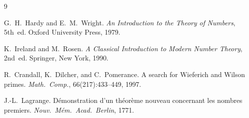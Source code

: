 \documentclass[12pt,a4paper]{amsart}
\theoremstyle{definition}
\begin{document}
\begin{thebibliography}{9}

G.~H.~Hardy and E.~M.~Wright.
\newblock \emph{An Introduction to the Theory of Numbers}, 5th~ed.
\newblock Oxford University Press, 1979.

K.~Ireland and M.~Rosen.
\newblock \emph{A Classical Introduction to Modern Number Theory}, 2nd~ed.
\newblock Springer, New York, 1990.

R.~Crandall, K.~Dilcher, and C.~Pomerance.
\newblock A search for Wieferich and Wilson primes.
\newblock \emph{Math.\ Comp.}, 66(217):433--449, 1997.

J.-L.~Lagrange.
\newblock Démonstration d'un théorème nouveau concernant les nombres premiers.
\newblock \emph{Nouv.\ Mém.\ Acad.\ Berlin}, 1771.

\end{thebibliography}
\end{document}
